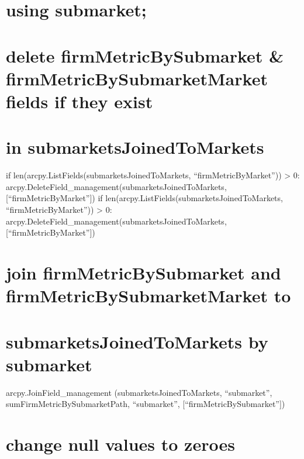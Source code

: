 \documentclass[]{article}
\begin{document}
\section{using submarket;}\label{using-submarket}

\section{delete firmMetricBySubmarket \& firmMetricBySubmarketMarket
fields if they
exist}\label{delete-firmmetricbysubmarket-firmmetricbysubmarketmarket-fields-if-they-exist}

\section{in
submarketsJoinedToMarkets}\label{in-submarketsjoinedtomarkets}

if len(arcpy.ListFields(submarketsJoinedToMarkets,
``firmMetricByMarket'')) \textgreater{} 0:
arcpy.DeleteField\_management(submarketsJoinedToMarkets,{[}``firmMetricByMarket''{]})
if len(arcpy.ListFields(submarketsJoinedToMarkets,
``firmMetricByMarket'')) \textgreater{} 0:
arcpy.DeleteField\_management(submarketsJoinedToMarkets,{[}``firmMetricByMarket''{]})

\section{join firmMetricBySubmarket and firmMetricBySubmarketMarket
to}\label{join-firmmetricbysubmarket-and-firmmetricbysubmarketmarket-to}

\section{submarketsJoinedToMarkets by
submarket}\label{submarketsjoinedtomarkets-by-submarket}

arcpy.JoinField\_management (submarketsJoinedToMarkets, ``submarket'',
sumFirmMetricBySubmarketPath, ``submarket'',
{[}``firmMetricBySubmarket''{]})

\section{change null values to
zeroes}\label{change-null-values-to-zeroes}
\end{document}
